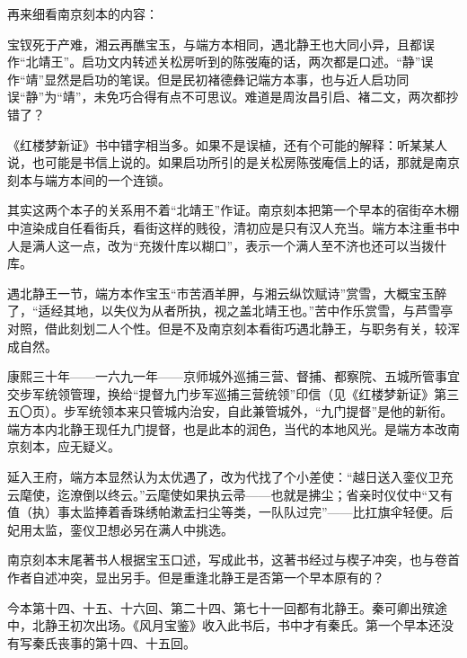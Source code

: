 \par 再来细看南京刻本的内容：
\par 宝钗死于产难，湘云再醮宝玉，与端方本相同，遇北静王也大同小异，且都误作“北靖王”。启功文内转述关松房听到的陈弢庵的话，两次都是口述。“静”误作“靖”显然是启功的笔误。但是民初褚德彝记端方本事，也与近人启功同误“静”为“靖”，未免巧合得有点不可思议。难道是周汝昌引启、褚二文，两次都抄错了？
\par 《红楼梦新证》书中错字相当多。如果不是误植，还有个可能的解释：听某某人说，也可能是书信上说的。如果启功所引的是关松房陈弢庵信上的话，那就是南京刻本与端方本间的一个连锁。
\par 其实这两个本子的关系用不着“北靖王”作证。南京刻本把第一个早本的宿街卒木棚中渲染成自任看街兵，看街这样的贱役，清初应是只有汉人充当。端方本注重书中人是满人这一点，改为“充拨什库以糊口”，表示一个满人至不济也还可以当拨什库。
\par 遇北静王一节，端方本作宝玉“市苦酒羊胛，与湘云纵饮赋诗”赏雪，大概宝玉醉了，“适经其地，以失仪为从者所执，视之盖北靖王也。”苦中作乐赏雪，与芦雪亭对照，借此刻划二人个性。但是不及南京刻本看街巧遇北静王，与职务有关，较浑成自然。
\par 康熙三十年——一六九一年——京师城外巡捕三营、督捕、都察院、五城所管事宜交步军统领管理，换给“提督九门步军巡捕三营统领”印信（见《红楼梦新证》第三五〇页）。步军统领本来只管城内治安，自此兼管城外，“九门提督”是他的新衔。端方本内北静王现任九门提督，也是此本的润色，当代的本地风光。是端方本改南京刻本，应无疑义。
\par 延入王府，端方本显然认为太优遇了，改为代找了个小差使：“越日送入銮仪卫充云麾使，迄潦倒以终云。”云麾使如果执云帚——也就是拂尘；省亲时仪仗中“又有值（执）事太监捧着香珠绣帕漱盂扫尘等类，一队队过完”——比扛旗伞轻便。后妃用太监，銮仪卫想必另在满人中挑选。
\par 南京刻本末尾著书人根据宝玉口述，写成此书，这著书经过与楔子冲突，也与卷首作者自述冲突，显出另手。但是重逢北静王是否第一个早本原有的？
\par 今本第十四、十五、十六回、第二十四、第七十一回都有北静王。秦可卿出殡途中，北静王初次出场。《风月宝鉴》收入此书后，书中才有秦氏。第一个早本还没有写秦氏丧事的第十四、十五回。
